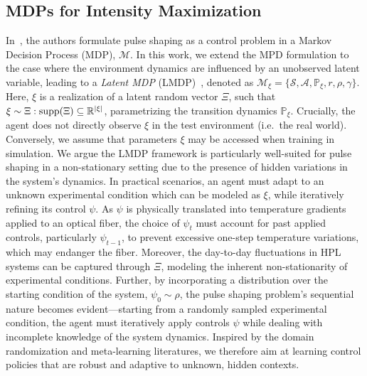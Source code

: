\subsection{MDPs for Intensity Maximization}\label{sec:mdp}
In~\cite{capuano2023temporl}, the authors formulate pulse shaping as a control problem in a Markov Decision Process (MDP), \( \mathcal{M} \). In this work, we extend the MPD formulation to the case where the environment dynamics are influenced by an unobserved latent variable, leading to a \textit{Latent MDP} (LMDP)~\citep{chen2021understanding}, denoted as \(\mathcal{M}_\xi = \{\mathcal{S}, \mathcal{A}, \mathbb{P}_\xi, r, \rho, \gamma\}\). 
Here, \( \xi \) is a realization of a latent random vector \( \Xi \), such that \(\xi \sim \Xi : \operatorname{supp}(\Xi) \subseteq \mathbb{R}^{|\xi|}\), parametrizing the transition dynamics \( \mathbb{P}_\xi \). Crucially, the agent does not directly observe \( \xi \) in the test environment (i.e.~the real world).
Conversely, we assume that parameters \( \xi \) may be accessed when training in simulation.
We argue the LMDP framework is particularly well-suited for pulse shaping in a non-stationary setting due to the presence of hidden variations in the system's dynamics. In practical scenarios, an agent must adapt to an unknown experimental condition which can be modeled as \( \xi \), while iteratively refining its control \( \psi \). As \( \psi \) is physically translated into temperature gradients applied to an optical fiber, the choice of \( \psi_t \) must account for past applied controls, particularly \( \psi_{t-1} \), to prevent excessive one-step temperature variations, which may endanger the fiber. Moreover, the day-to-day fluctuations in HPL systems can be captured through \( \Xi\), modeling the inherent non-stationarity of experimental conditions. Further, by incorporating a distribution over the starting condition of the system, \( \psi_0 \sim \rho \), the pulse shaping problem's sequential nature becomes evident---starting from a randomly sampled experimental condition, the agent must iteratively apply controls \(\psi\) while dealing with incomplete knowledge of the system dynamics.
Inspired by the domain randomization and meta-learning literatures, we therefore aim at learning control policies that are robust and adaptive to unknown, hidden contexts.

